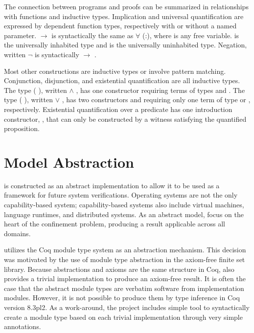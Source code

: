The connection between programs and proofs can be summarized in relationships with functions and inductive types.
Implication and universal quantification are expressed by dependent function types, respectively with or without a named parameter.
 \(\rightarrow\)  is syntactically the same as \(\forall\) (\coqkw{\_}:),  where \coqkw{\_} is any free variable.
 is the universally inhabited type and  is the universally uninhabited type.
Negation, written \(\neg\)  is syntactically  \(\rightarrow\) .

Most other constructions are inductive types or involve pattern matching.
Conjunction, disjunction, and existential quantification are all inductive types.
The type (  ), written  \(\wedge\) , has one constructor  requiring terms of types  and .
The type (  ), written  \(\vee\) , has two constructors  and  requiring only one term of type  or , respectively.
Existential quantification over a predicate has one introduction constructor, , that can only be constructed by a witness satisfying the quantified proposition.

\section{Model Abstraction}
\label{sect:coq:modelAbstraction}

\TMmodelName{} is constructed as an abstract implementation to allow it to be used as a framework for future system verifications.
Operating systems are not the only capability-based system; capability-based systems also include virtual machines, language runtimes, and distributed systems.
As an abstract model, \TMmodelName{} focus on the heart of the confinement problem, producing a result applicable across all domains.

\TMmodelName{} utilizes the Coq module type system as an abstraction mechanism.
This decision was motivated by the use of module type abstraction in the axiom-free finite set library.
Because abstractions and axioms are the same structure in Coq, \TMmodelName{} also provides a trivial implementation to produce an axiom-free result.
It is often the case that the abstract module types are verbatim software from implementation modules.
However, it is not possible to produce them by type inference in Coq version 8.3pl2.
As a work-around, the project includes simple tool to syntactically create a module type based on each trivial implementation through very simple annotations.

